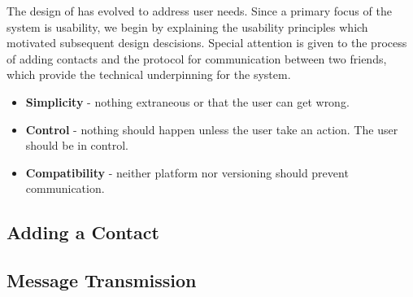 The design of \systemname has evolved to address user needs. Since a primary
focus of the system is usability, we begin by explaining the usability
principles which motivated subsequent design descisions.
Special attention is given to
the process of adding contacts and the protocol for communication between
two friends, which provide the technical underpinning for the system.

\begin{itemize}
  \item \textbf{Simplicity} - nothing extraneous or that the user can get wrong.
  \item \textbf{Control} - nothing should happen unless the user take an action. The user should be in control.
  \item \textbf{Compatibility} - neither platform nor versioning should prevent communication.
\end{itemize}


\subsection{Adding a Contact}
\subsection{Message Transmission}
